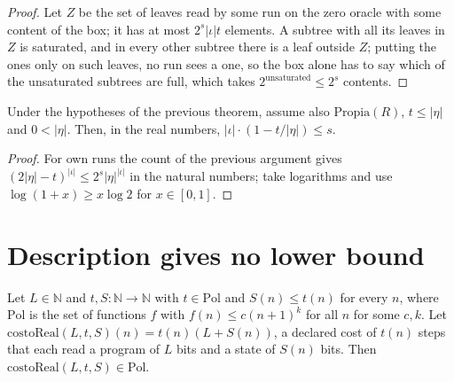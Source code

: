 \begin{proof}
  \leanok
  Let $Z$ be the set of leaves read by some run on the zero oracle with some content of the box;
  it has at most $2^s |\iota| t$ elements. A subtree with all its leaves in $Z$ is saturated, and in
  every other subtree there is a leaf outside $Z$; putting the ones only on such leaves, no run sees
  a one, so the box alone has to say which of the unsaturated subtrees are full, which takes
  $2^{\text{unsaturated}} \le 2^s$ contents.
\end{proof}

\begin{theorem}
  \label{thm:information-product-form}
  \leanok
  Under the hypotheses of the previous theorem, assume also $\mathrm{Propia}(R)$, $t \le |\eta|$ and
  $0 < |\eta|$. Then, in the real numbers, $|\iota| \cdot (1 - t / |\eta|) \le s$.
  \own{}
\end{theorem}

\begin{proof}
  \leanok
  For own runs the count of the previous argument gives $(2|\eta| - t)^{|\iota|} \le 2^s
  |\eta|^{|\iota|}$ in the natural numbers; take logarithms and use $\log (1 + x) \ge x \log 2$ for
  $x \in [0, 1]$.
\end{proof}

\section{Description gives no lower bound}
\label{sec:information-descriptive}

\begin{theorem}
  \label{thm:information-description-poly}
  \leanok
  Let $L \in \mathbb{N}$ and $t, S : \mathbb{N} \to \mathbb{N}$ with $t \in \mathrm{Pol}$ and
  $S(n) \le t(n)$ for every $n$, where $\mathrm{Pol}$ is the set of functions $f$ with
  $f(n) \le c (n+1)^k$ for all $n$ for some $c, k$. Let $\mathrm{costoReal}(L, t, S)(n) = t(n)
  (L + S(n))$, a declared cost of $t(n)$ steps that each read a program of $L$ bits and a state of
  $S(n)$ bits. Then $\mathrm{costoReal}(L, t, S) \in \mathrm{Pol}$.
  \own{}
\end{theorem}

